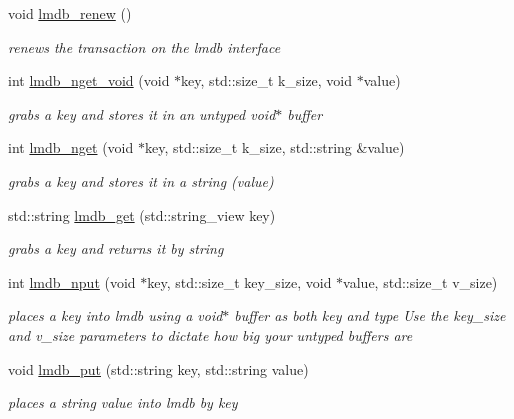 \begin{DoxyCompactItemize}
\mbox{\label{namespacemods_1_1db_afd5c08c56ba18bdd8c650d8d7345ad7f}} 
void \hyperlink{namespacemods_1_1db_afd5c08c56ba18bdd8c650d8d7345ad7f}{lmdb\+\_\+renew} ()
\begin{DoxyCompactList}\small\item\em renews the transaction on the lmdb interface \end{DoxyCompactList}\item 
int \hyperlink{namespacemods_1_1db_a2964d817c59b9a29ac62f0e67e080254}{lmdb\+\_\+nget\+\_\+void} (void $\ast$key, std\+::size\+\_\+t k\+\_\+size, void $\ast$value)
\begin{DoxyCompactList}\small\item\em grabs a key and stores it in an untyped void$\ast$ buffer \end{DoxyCompactList}\item 
int \hyperlink{namespacemods_1_1db_a72e95918c9bc92bd82716f200f81eec5}{lmdb\+\_\+nget} (void $\ast$key, std\+::size\+\_\+t k\+\_\+size, std\+::string \&value)
\begin{DoxyCompactList}\small\item\em grabs a key and stores it in a string (value) \end{DoxyCompactList}\item 
std\+::string \hyperlink{namespacemods_1_1db_a76eb530e6b65cbed6c0462ccd14cdc94}{lmdb\+\_\+get} (std\+::string\+\_\+view key)
\begin{DoxyCompactList}\small\item\em grabs a key and returns it by string \end{DoxyCompactList}\item 
int \hyperlink{namespacemods_1_1db_ab9ca8045480b5c845000f2dda073939e}{lmdb\+\_\+nput} (void $\ast$key, std\+::size\+\_\+t key\+\_\+size, void $\ast$value, std\+::size\+\_\+t v\+\_\+size)
\begin{DoxyCompactList}\small\item\em places a key into lmdb using a void$\ast$ buffer as both key and type Use the key\+\_\+size and v\+\_\+size parameters to dictate how big your untyped buffers are \end{DoxyCompactList}\item 
void \hyperlink{namespacemods_1_1db_aa7e3b257ce6a2920b088cc798af79da6}{lmdb\+\_\+put} (std\+::string key, std\+::string value)
\begin{DoxyCompactList}\small\item\em places a string value into lmdb by key \end{DoxyCompactList}\item 

\end{DoxyCompactItemize}
